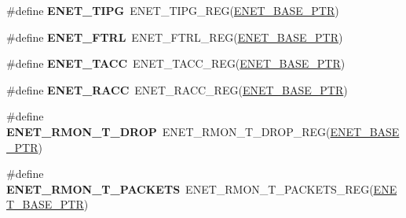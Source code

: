 \begin{DoxyCompactItemize}
\item 
\hypertarget{group___e_n_e_t___register___accessor___macros_gabe58036eccc710309006a0f4cd5876da}{}\#define {\bfseries E\+N\+E\+T\+\_\+\+T\+I\+P\+G}~E\+N\+E\+T\+\_\+\+T\+I\+P\+G\+\_\+\+R\+E\+G(\hyperlink{group___e_n_e_t___peripheral_gab64a2d991cc2bd76dd55ee25a52dcb5c}{E\+N\+E\+T\+\_\+\+B\+A\+S\+E\+\_\+\+P\+T\+R})\label{group___e_n_e_t___register___accessor___macros_gabe58036eccc710309006a0f4cd5876da}

\item 
\hypertarget{group___e_n_e_t___register___accessor___macros_gaf0bf2bc9f38cc18b173e47f991e804a0}{}\#define {\bfseries E\+N\+E\+T\+\_\+\+F\+T\+R\+L}~E\+N\+E\+T\+\_\+\+F\+T\+R\+L\+\_\+\+R\+E\+G(\hyperlink{group___e_n_e_t___peripheral_gab64a2d991cc2bd76dd55ee25a52dcb5c}{E\+N\+E\+T\+\_\+\+B\+A\+S\+E\+\_\+\+P\+T\+R})\label{group___e_n_e_t___register___accessor___macros_gaf0bf2bc9f38cc18b173e47f991e804a0}

\item 
\hypertarget{group___e_n_e_t___register___accessor___macros_gaad331e25ed239795b63e6f0c546efbbb}{}\#define {\bfseries E\+N\+E\+T\+\_\+\+T\+A\+C\+C}~E\+N\+E\+T\+\_\+\+T\+A\+C\+C\+\_\+\+R\+E\+G(\hyperlink{group___e_n_e_t___peripheral_gab64a2d991cc2bd76dd55ee25a52dcb5c}{E\+N\+E\+T\+\_\+\+B\+A\+S\+E\+\_\+\+P\+T\+R})\label{group___e_n_e_t___register___accessor___macros_gaad331e25ed239795b63e6f0c546efbbb}

\item 
\hypertarget{group___e_n_e_t___register___accessor___macros_gab8cef4267c0501acfbe1f6d7e7bbf0c4}{}\#define {\bfseries E\+N\+E\+T\+\_\+\+R\+A\+C\+C}~E\+N\+E\+T\+\_\+\+R\+A\+C\+C\+\_\+\+R\+E\+G(\hyperlink{group___e_n_e_t___peripheral_gab64a2d991cc2bd76dd55ee25a52dcb5c}{E\+N\+E\+T\+\_\+\+B\+A\+S\+E\+\_\+\+P\+T\+R})\label{group___e_n_e_t___register___accessor___macros_gab8cef4267c0501acfbe1f6d7e7bbf0c4}

\item 
\hypertarget{group___e_n_e_t___register___accessor___macros_gac5608b729470cc47103c854e2f880d9c}{}\#define {\bfseries E\+N\+E\+T\+\_\+\+R\+M\+O\+N\+\_\+\+T\+\_\+\+D\+R\+O\+P}~E\+N\+E\+T\+\_\+\+R\+M\+O\+N\+\_\+\+T\+\_\+\+D\+R\+O\+P\+\_\+\+R\+E\+G(\hyperlink{group___e_n_e_t___peripheral_gab64a2d991cc2bd76dd55ee25a52dcb5c}{E\+N\+E\+T\+\_\+\+B\+A\+S\+E\+\_\+\+P\+T\+R})\label{group___e_n_e_t___register___accessor___macros_gac5608b729470cc47103c854e2f880d9c}

\item 
\hypertarget{group___e_n_e_t___register___accessor___macros_gaa86be980a2a0cdfa7133cbba2d02fd4d}{}\#define {\bfseries E\+N\+E\+T\+\_\+\+R\+M\+O\+N\+\_\+\+T\+\_\+\+P\+A\+C\+K\+E\+T\+S}~E\+N\+E\+T\+\_\+\+R\+M\+O\+N\+\_\+\+T\+\_\+\+P\+A\+C\+K\+E\+T\+S\+\_\+\+R\+E\+G(\hyperlink{group___e_n_e_t___peripheral_gab64a2d991cc2bd76dd55ee25a52dcb5c}{E\+N\+E\+T\+\_\+\+B\+A\+S\+E\+\_\+\+P\+T\+R})\label{group___e_n_e_t___register___accessor___macros_gaa86be980a2a0cdfa7133cbba2d02fd4d}


\end{DoxyCompactItemize}
